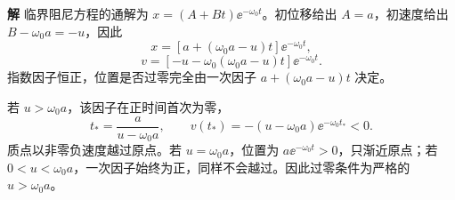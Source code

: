 \documentclass[11pt,openany,fontset=fandol]{ctexbook}
\theoremstyle{definition}\newtheorem{example}{例}[chapter]\newtheorem{exercise}{习题}[chapter]
\newcommand{\SolutionStart}{\par\medskip\ifdim\pagetotal>0pt\ifdim\dimexpr\pagegoal-\pagetotal\relax<3\baselineskip\newpage\fi\fi\noindent\textbf{解}\quad\ignorespaces}
\newenvironment{solution}{\SolutionStart}{\par\medskip}
\begin{document}
\begin{solution}
临界阻尼方程的通解为 $x=(A+Bt)\ee^{-\omega_0t}$。初位移给出 $A=a$，初速度给出 $B-\omega_0a=-u$，因此
\[
x=[a+(\omega_0a-u)t]\ee^{-\omega_0t},
\]
\[
v=[-u-\omega_0(\omega_0a-u)t]\ee^{-\omega_0t}.
\]
指数因子恒正，位置是否过零完全由一次因子 $a+(\omega_0a-u)t$ 决定。

若 $u>\omega_0a$，该因子在正时间首次为零，
\[
t_*=\frac a{u-\omega_0a},\qquad
v(t_*)=-(u-\omega_0a)\ee^{-\omega_0t_*}<0.
\]
质点以非零负速度越过原点。若 $u=\omega_0a$，位置为 $a\ee^{-\omega_0t}>0$，只渐近原点；若 $0<u<\omega_0a$，一次因子始终为正，同样不会越过。因此过零条件为严格的 $u>\omega_0a$。

\begin{figure}[H]\centering
{}
\end{figure}
\end{solution}
\end{document}
